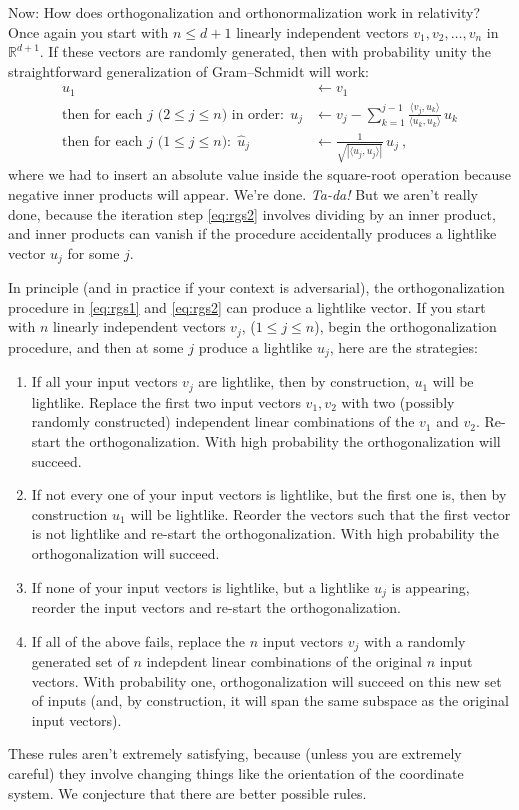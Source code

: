 \documentclass{article}
\newcommand{\inner}[2]{\langle{#1},{#2}\rangle}
\begin{document}
Now: How does orthogonalization and orthonormalization work in relativity?
Once again you start with $n\leq d+1$ linearly independent vectors $v_1,v_2,\ldots,v_n$ in $\mathbb{R}^{d+1}$.
If these vectors are randomly generated, then with probability unity the straightforward generalization of Gram--Schmidt will work:
\begin{align}
    u_1 &\leftarrow v_1 \label{eq:rgs1}
    \\
    \mbox{then for each $j$ ($2\leq j\leq n$) in order:} ~~ u_j &\leftarrow v_j - \sum_{k=1}^{j-1} \frac{\inner{v_j}{u_k}}{\inner{u_k}{u_k}}\,u_k \label{eq:rgs2}
    \\
    \mbox{then for each $j$ ($1\leq j\leq n$):} ~~ \hat{u}_j &\leftarrow \frac{1}{\sqrt{|\inner{u_j}{u_j}|}}\,u_j ~, \label{eq:rgs3}
\end{align}
where we had to insert an absolute value inside the square-root operation because negative inner products will appear.
We're done. \emph{Ta-da!}
But we aren't really done, because the iteration step \eqref{eq:rgs2} involves dividing by an inner product, and inner products can vanish if the procedure accidentally produces a lightlike vector $u_j$ for some $j$.

In principle (and in practice if your context is adversarial), the orthogonalization procedure in \eqref{eq:rgs1} and \eqref{eq:rgs2} can produce a lightlike vector.
If you start with $n$ linearly independent vectors $v_j$, ($1\leq j\leq n$), begin the orthogonalization procedure, and then at some $j$ produce a lightlike $u_j$, here are the strategies:
\begin{enumerate}
    \item If all your input vectors $v_j$ are lightlike, then by construction, $u_1$ will be lightlike.
    Replace the first two input vectors $v_1, v_2$ with two (possibly randomly constructed) independent linear combinations of the $v_1$ and $v_2$.
    Re-start the orthogonalization.
    With high probability the orthogonalization will succeed.
    \item If not every one of your input vectors is lightlike, but the first one is, then by construction $u_1$ will be lightlike.
    Reorder the vectors such that the first vector is not lightlike and re-start the orthogonalization.
    With high probability the orthogonalization will succeed.
    \item If none of your input vectors is lightlike, but a lightlike $u_j$ is appearing, reorder the input vectors and re-start the orthogonalization.
    \item If all of the above fails, replace the $n$ input vectors $v_j$ with a randomly generated set of $n$ indepdent linear combinations of the original $n$ input vectors.
    With probability one, orthogonalization will succeed on this new set of inputs (and, by construction, it will span the same subspace as the original input vectors).
\end{enumerate}
These rules aren't extremely satisfying, because (unless you are extremely careful) they involve changing things like the orientation of the coordinate system.
We conjecture that there are better possible rules.
\end{document}
